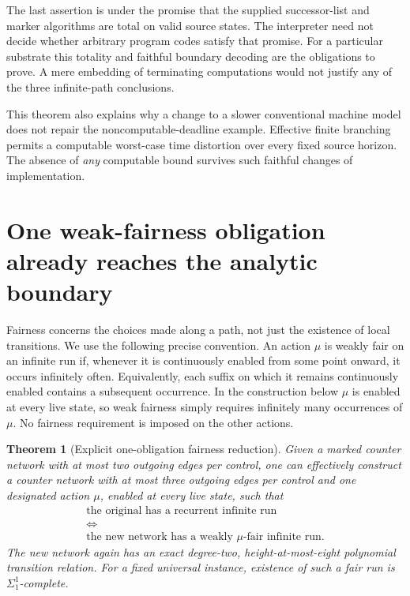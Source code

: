\documentclass[11pt,letterpaper]{article}
\newtheorem{theorem}{Theorem}[section]
\theoremstyle{definition}
\theoremstyle{remark}
\newcommand{\1}{\mathbf 1}
\newcommand{\srctag}[1]{\texorpdfstring{\hspace{0.4em}{\normalfont\small\color{accent}[source #1]}}{ [source #1]}}
\begin{document}
The last assertion is under the promise that the supplied successor-list
and marker algorithms are total on valid source states. The interpreter
need not decide whether arbitrary program codes satisfy that promise.
For a particular substrate this totality and faithful boundary decoding
are the obligations to prove. A mere embedding of terminating computations
would not justify any of the three infinite-path conclusions.

This theorem also explains why a change to a slower conventional machine
model does not repair the noncomputable-deadline example. Effective finite
branching permits a computable worst-case time distortion over every fixed
source horizon. The absence of \emph{any} computable bound survives such
faithful changes of implementation.
\section{One weak-fairness obligation already reaches the analytic boundary\srctag{03}}
\label{lbh:qd:sec:fairness}

Fairness concerns the choices made along a path, not just the existence of
local transitions. We use the following precise convention. An action
$\mu$ is weakly fair on an infinite run if, whenever it is continuously
enabled from some point onward, it occurs infinitely often. Equivalently,
each suffix on which it remains continuously enabled contains a subsequent
occurrence. In the construction below $\mu$ is enabled at every live state,
so weak fairness simply requires infinitely many occurrences of $\mu$.
No fairness requirement is imposed on the other actions.

\begin{theorem}[Explicit one-obligation fairness reduction]
\label{lbh:qd:thm:fairness}
Given a marked counter network with at most two outgoing edges per control,
one can effectively construct a counter network with at most three outgoing
edges per control and one designated action $\mu$, enabled at every live
state, such that
\[
 \begin{gathered}
 \text{the original has a recurrent infinite run}\\
 \Longleftrightarrow\\[-2pt]
 \text{the new network has a weakly }\mu\text{-fair infinite run}.
 \end{gathered}
\]
The new network again has an exact degree-two, height-at-most-eight
polynomial transition relation. For a fixed universal instance, existence
of such a fair run is $\Sigma^1_1$-complete.
\end{theorem}
\end{document}
